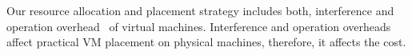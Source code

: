 Our resource allocation and placement strategy includes both, interference and operation overhead~\cite{lin2012interference, li2013performance} of virtual machines. Interference and operation overheads affect practical VM placement on physical machines, therefore, it affects the cost.



